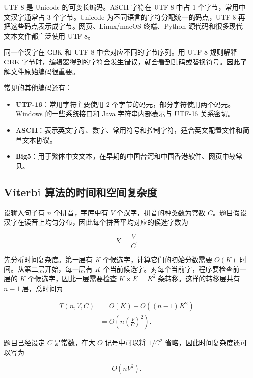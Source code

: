 \documentclass[11pt,a4paper]{ctexart}
\begin{document}
UTF-8 是 Unicode 的可变长编码。ASCII 字符在 UTF-8 中占 1 个字节，常用中文汉字通常占 3 个字节。Unicode 为不同语言的字符分配统一的码点，UTF-8 再把这些码点表示成字节。网页、Linux/macOS 终端、Python 源代码和很多现代文本文件都广泛使用 UTF-8。

同一个汉字在 GBK 和 UTF-8 中会对应不同的字节序列。用 UTF-8 规则解释 GBK 字节时，编辑器得到的字符会发生错误，就会看到乱码或替换符号。因此了解文件原始编码很重要。

常见的其他编码还有：

\begin{itemize}[leftmargin=2.2em]
  \item \textbf{UTF-16}：常用字符主要使用 2 个字节的码元，部分字符使用两个码元。Windows 的一些系统接口和 Java 字符串内部表示与 UTF-16 关系密切。
  \item \textbf{ASCII}：表示英文字母、数字、常用符号和控制字符，适合英文配置文件和简单文本协议。
  \item \textbf{Big5}：用于繁体中文文本，在早期的中国台湾和中国香港软件、网页中较常见。
\end{itemize}

\subsection{Viterbi 算法的时间和空间复杂度}

设输入句子有 $n$ 个拼音，字库中有 $V$ 个汉字，拼音的种类数为常数 $C$。题目假设汉字在读音上均匀分布，因此每个拼音平均对应的候选字数为

\begin{equation}
K=\frac{V}{C}.
\end{equation}

先分析时间复杂度。第一层有 $K$ 个候选字，计算它们的初始分数需要 $O(K)$ 时间。从第二层开始，每一层有 $K$ 个当前候选字。对每个当前字，程序要检查前一层的 $K$ 个候选字，因此一层需要检查 $K\times K=K^2$ 条转移。这样的转移层共有 $n-1$ 层，总时间为

\begin{equation}
\begin{aligned}
T(n,V,C)
&=O(K)+O((n-1)K^2)\\
&=O\!\left(n\left(\frac{V}{C}\right)^2\right).
\end{aligned}
\end{equation}

题目已经设定 $C$ 是常数，在大 $O$ 记号中可以将 $1/C^2$ 省略，因此时间复杂度还可以写为

\begin{equation}
O(nV^2).
\end{equation}
\end{document}
